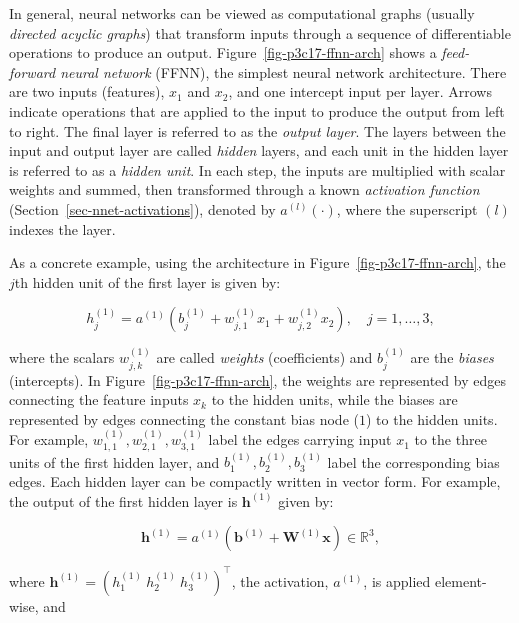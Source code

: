 \documentclass[
  letterpaper,
  krantz2]{style/krantz}
\begin{document}
In general, neural networks can be viewed as computational graphs
(usually \emph{directed acyclic graphs}) that transform inputs through a
sequence of differentiable operations to produce an output.
Figure~\ref{fig-p3c17-ffnn-arch} shows a \emph{feed-forward neural
network} (FFNN), the simplest neural network
architecture. There
are two inputs (features), \(x_1\) and \(x_2\), and one intercept input
per layer. Arrows indicate operations that are applied to the input to
produce the output from left to right. The final layer is referred to as
the \emph{output layer}. The layers between the input and output layer
are called \emph{hidden} layers, and each unit in the hidden layer is
referred to as a \emph{hidden unit}.
In each step, the inputs are multiplied with scalar weights and summed,
then transformed through a known \emph{activation function}
(Section~\ref{sec-nnet-activations}), denoted by \(a^{(l)}(\cdot)\),
where the superscript \((l)\) indexes the
layer.

As a concrete example, using the architecture in
Figure~\ref{fig-p3c17-ffnn-arch}, the \(j\)th hidden unit of the first
layer is given by:

\[
h_j^{(1)} = a^{(1)}\!\left(b_j^{(1)} + w_{j,1}^{(1)} x_1 + w_{j,2}^{(1)} x_2\right), \quad j = 1, \ldots, 3,
\]

where the scalars \(w_{j,k}^{(1)}\) are called \emph{weights}
(coefficients) and \(b_j^{(1)}\) are the \emph{biases} (intercepts).
 In
Figure~\ref{fig-p3c17-ffnn-arch}, the weights are represented by edges
connecting the feature inputs \(x_k\) to the hidden units, while the
biases are represented by edges connecting the constant bias node
(\(1\)) to the hidden units. For example,
\(w_{1,1}^{(1)}, w_{2,1}^{(1)}, w_{3,1}^{(1)}\) label the edges carrying
input \(x_1\) to the three units of the first hidden layer, and
\(b_1^{(1)}, b_2^{(1)}, b_3^{(1)}\) label the corresponding bias edges.
Each hidden layer can be compactly written in vector form. For example,
the output of the first hidden layer is \(\mathbf{h}^{(1)}\) given by:

\[
\mathbf{h}^{(1)} = a^{(1)}\!\left(\mathbf{b}^{(1)} + \mathbf{W}^{(1)} \mathbf{x}\right) \in \mathbb{R}^3,
\]

where \(\mathbf{h}^{(1)} = (h_1^{(1)} \ h_2^{(1)} \ h_3^{(1)})^\top\),
the activation, \(a^{(1)}\), is applied element-wise, and
\end{document}
